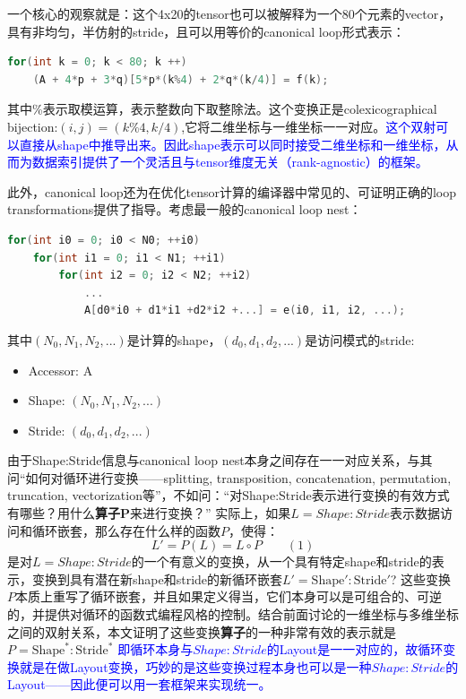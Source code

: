 \documentclass{article}
\begin{document}
一个核心的观察就是：这个4x20的tensor也可以被解释为一个80个元素的vector，具有非均匀，半仿射的stride，且可以用等价的canonical loop形式表示：
\begin{lstlisting}[language=C++]
for(int k = 0; k < 80; k ++)
    (A + 4*p + 3*q)[5*p*(k%4) + 2*q*(k/4)] = f(k);
\end{lstlisting}
其中\%表示取模运算，\/表示整数向下取整除法。这个变换正是colexicographical bijection:$(i,j) = (k\%4, k/4)$,它将二维坐标与一维坐标一一对应。\textcolor{blue}{这个双射可以直接从shape中推导出来。因此shape表示可以同时接受二维坐标和一维坐标，从而为数据索引提供了一个灵活且与tensor维度无关（rank-agnostic）的框架。}

此外，canonical loop还为在优化tensor计算的编译器中常见的、可证明正确的loop transformations提供了指导。考虑最一般的canonical loop nest：
\begin{lstlisting}[language=C++]
for(int i0 = 0; i0 < N0; ++i0)
    for(int i1 = 0; i1 < N1; ++i1)
        for(int i2 = 0; i2 < N2; ++i2)
            ...
            A[d0*i0 + d1*i1 +d2*i2 +...] = e(i0, i1, i2, ...);
\end{lstlisting}
其中$(N_{0}, N_{1}, N_{2}, ...)$是计算的shape，$(d_{0}, d_{1}, d_{2}, ...)$是访问模式的stride:
\begin{itemize}
    \item Accessor: A
    \item Shape: $(N_{0}, N_{1}, N_{2}, ...)$
    \item Stride: $(d_{0}, d_{1}, d_{2}, ...)$
\end{itemize}
由于Shape:Stride信息与canonical loop nest本身之间存在一一对应关系，与其问“如何对循环进行变换——splitting, transposition, concatenation, permutation, truncation, vectorization等”，不如问：“对Shape:Stride表示进行变换的有效方式有哪些？用什么\textbf{算子P}来进行变换？” 实际上，如果$L=Shape:Stride$表示数据访问和循环嵌套，那么存在什么样的函数$P$，使得：
\[
L' = P(L) = L \circ P  \qquad (1)
\]
是对$L=Shape:Stride$的一个有意义的变换，从一个具有特定shape和stride的表示，变换到具有潜在新shape和stride的新循环嵌套$L' = \text{Shape}' : \text{Stride}'$? 这些变换$P$本质上重写了循环嵌套，并且如果定义得当，它们本身可以是可组合的、可逆的，并提供对循环的函数式编程风格的控制。结合前面讨论的一维坐标与多维坐标之间的双射关系，本文证明了这些变换\textbf{算子}的一种非常有效的表示就是$P = \text{Shape}^* : \text{Stride}^*$ \textcolor{blue}{即循环本身与$Shape:Stride$的Layout是一一对应的，故循环变换就是在做Layout变换，巧妙的是这些变换过程本身也可以是一种$Shape:Stride$的Layout——因此便可以用一套框架来实现统一。}
\end{document}
